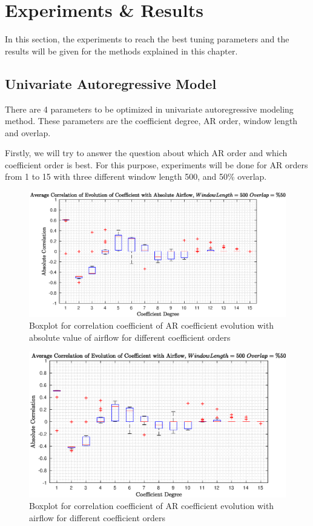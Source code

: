 \section{Experiments \& Results}
In this section, the experiments to reach the best tuning parameters and the results will be given for the methods explained in this chapter.
\subsection{Univariate Autoregressive Model}
There are 4 parameters to be optimized in univariate autoregressive modeling method. These parameters are the coefficient degree, AR order, window length and overlap.  \par
Firstly, we will try to answer the question about which AR order and which coefficient order is best. For this purpose, experiments will be done for AR orders from 1 to 15 with three different window length 500, and 50\% overlap. 
\begin{figure}
	\begin{center}
		\includegraphics[width=\textwidth]{figures/corr_abs_coeff_for_degree_selection.eps}
		\caption{Boxplot for correlation coefficient of AR coefficient evolution with absolute value of airflow for different coefficient orders}
		\label{fig:absolute_airflow_window_coef}
	\end{center}
\end{figure}
\begin{figure}
	\begin{center}
		\includegraphics[width=\textwidth]{figures/corr_normal_coeff_for_degree_selection.eps}
		\caption{Boxplot for correlation coefficient of AR coefficient evolution with airflow for different coefficient orders}
		\label{fig:normal_airflow_window_coef}
	\end{center}
\end{figure}

